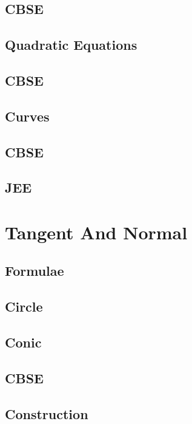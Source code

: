 \documentclass[journal]{IEEEtran}
\begin{document}
\subsection{CBSE}

\subsection{Quadratic Equations}

\subsection{CBSE}

\subsection{Curves}

\subsection{CBSE}

\subsection{JEE}
 

\newpage
\section{Tangent And Normal}
\subsection{Formulae}

\subsection{Circle}

\subsection{Conic}

\subsection{CBSE}

\subsection{Construction}

\end{document}
